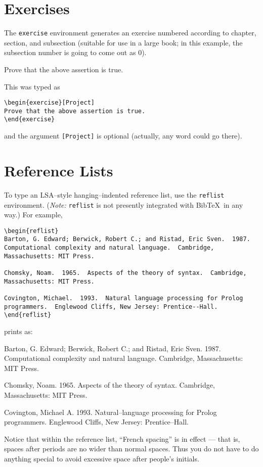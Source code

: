 \documentclass{article}
\begin{document}
\section{Exercises}

The \texttt{exercise} environment generates an exercise numbered according 
to chapter, section, and subsection (suitable for use in a large book; 
in this example, the subsection number is going to come out as 0).
\begin{exercise}[Project]
Prove that the above assertion is true.
\end{exercise}
This was typed as
\begin{verbatim}
\begin{exercise}[Project]
Prove that the above assertion is true.
\end{exercise}
\end{verbatim}
and the argument \verb"[Project]" is optional (actually, any word could 
go there).

\section{Reference Lists}

To type an LSA--style hanging--indented reference list, use the \texttt{reflist}
environment.  (\emph{Note:} \texttt{reflist} is not presently
integrated with Bib\TeX\ in any way.)  For example,
\begin{verbatim}
\begin{reflist}
Barton, G. Edward; Berwick, Robert C.; and Ristad, Eric Sven.  1987.
Computational complexity and natural language.  Cambridge, 
Massachusetts: MIT Press.

Chomsky, Noam.  1965.  Aspects of the theory of syntax.  Cambridge,
Massachusetts: MIT Press.

Covington, Michael.  1993.  Natural language processing for Prolog
programmers.  Englewood Cliffs, New Jersey: Prentice--Hall.
\end{reflist}
\end{verbatim}
prints as:
\begin{reflist}
Barton, G. Edward; Berwick, Robert C.; and Ristad, Eric Sven.  1987.
Computational complexity and natural language.  Cambridge, 
Massachusetts: MIT Press.

Chomsky, Noam.  1965.  Aspects of the theory of syntax.  Cambridge,
Massachusetts: MIT Press.

Covington, Michael A.  1993.  Natural--language processing for Prolog 
programmers.  Englewood Cliffs, New Jersey: Prentice--Hall.
\end{reflist}
Notice that within the reference list, ``French spacing'' is in effect 
--- that is, spaces after periods are no wider than normal spaces. Thus 
you do not have to do anything special to avoid excessive space after 
people's initials.
\end{document}
